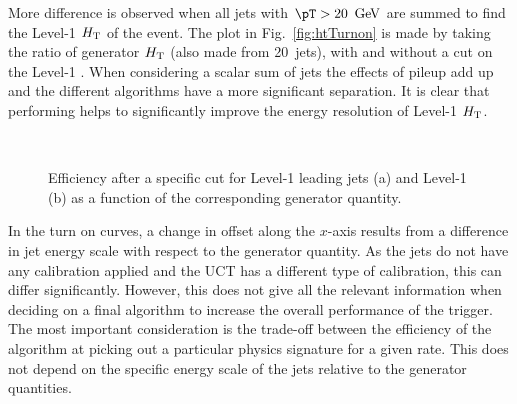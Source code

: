 More difference is observed when all jets with $\pT>20~\gev$ are
summed to find the Level-1 $\mbox{$H_\text{T}$}$ of the event. The plot in
Fig.~\ref{fig:htTurnon} is made by taking the ratio of generator $\mbox{$H_\text{T}$}$
(also made from 20~\gev jets), with and without a cut on the Level-1
\HT. When considering a scalar sum of jets the effects of pileup
add up and the different algorithms have a more significant
separation. It is clear that performing \PUS helps to significantly
improve the energy resolution of Level-1 $\mbox{$H_\text{T}$}$.
\begin{figure}
  \centering
  ~
  \caption{ Efficiency after a specific cut for Level-1 leading jets (a) and Level-1 \HT
  (b) as a function of the corresponding generator quantity.
  } \label{fig:turnons}
\end{figure}

In the turn on curves, a change in offset along the $x$-axis results
from a difference in jet energy scale with respect to the generator
quantity. As the \GCT jets do not have any calibration applied and the
UCT has a different type of calibration, this can differ
significantly. However, this does not give all the relevant
information when deciding on a final algorithm to increase the overall
performance of the trigger. The most important consideration is the
trade-off between the efficiency of the algorithm at picking out a
particular physics signature for a given rate. This does not depend on
the specific energy scale of the jets relative to the generator
quantities.

